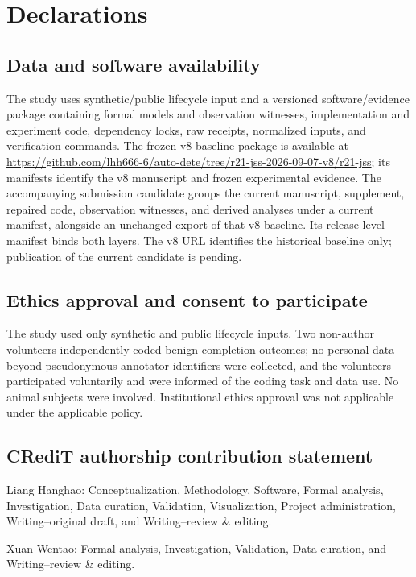 \section*{Declarations}

\subsection*{Data and software availability}

The study uses synthetic/public lifecycle input and a versioned software/evidence package containing formal models and observation witnesses, implementation and experiment code, dependency locks, raw receipts, normalized inputs, and verification commands. The frozen v8 baseline package is available at \url{https://github.com/lhh666-6/auto-dete/tree/r21-jss-2026-09-07-v8/r21-jss}; its manifests identify the v8 manuscript and frozen experimental evidence. The accompanying submission candidate groups the current manuscript, supplement, repaired code, observation witnesses, and derived analyses under a current manifest, alongside an unchanged export of that v8 baseline. Its release-level manifest binds both layers. The v8 URL identifies the historical baseline only; publication of the current candidate is pending.

\subsection*{Ethics approval and consent to participate}

The study used only synthetic and public lifecycle inputs. Two non-author volunteers independently coded benign completion outcomes; no personal data beyond pseudonymous annotator identifiers were collected, and the volunteers participated voluntarily and were informed of the coding task and data use. No animal subjects were involved. Institutional ethics approval was not applicable under the applicable policy.

\subsection*{CRediT authorship contribution statement}

Liang Hanghao: Conceptualization, Methodology, Software, Formal analysis, Investigation, Data curation, Validation, Visualization, Project administration, Writing--original draft, and Writing--review \& editing.

Xuan Wentao: Formal analysis, Investigation, Validation, Data curation, and Writing--review \& editing.

